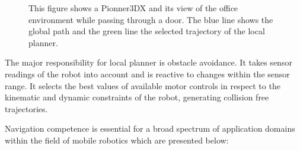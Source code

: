 \begin{figure}[thpb]
      \centering
      \def\svgwidth{0.7\textwidth}
      
      \caption{This figure shows a Pionner3DX and its view of the office environment while passing through a door. The blue line shows the global path and the green line the selected trajectory of the local planner.}
      \label{fig:fig_pioneer}
\end{figure}

The major responsibility for local planner is obstacle avoidance. It takes sensor readings of the robot into account and is reactive to changes within the sensor range. 
It selects the best values of available motor controls in respect to the kinematic and dynamic constraints of the robot, generating collision free trajectories. 
   
Navigation competence is essential for a broad spectrum of application domains within the field of mobile robotics which are presented below:

